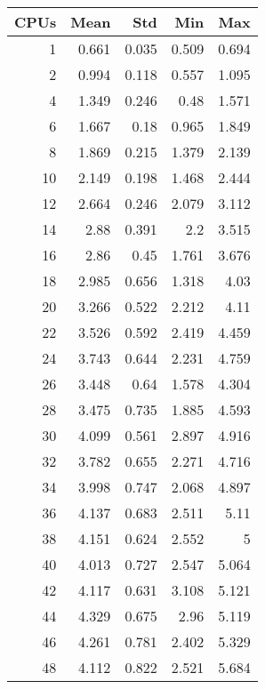 \begin{table}[htbp]
  \centering
  \begin{minipage}{.45\textwidth}
    \centering
    \scriptsize
\begin{tabular}{rrrrr}
\toprule
\textbf{CPUs} & \textbf{Mean} & \textbf{Std} & \textbf{Min} & \textbf{Max} \\
\midrule
1 & 0.661 & 0.035 & 0.509 & 0.694 \\
2 & 0.994 & 0.118 & 0.557 & 1.095 \\
4 & 1.349 & 0.246 & 0.48 & 1.571 \\
6 & 1.667 & 0.18 & 0.965 & 1.849 \\
8 & 1.869 & 0.215 & 1.379 & 2.139 \\
10 & 2.149 & 0.198 & 1.468 & 2.444 \\
12 & 2.664 & 0.246 & 2.079 & 3.112 \\
14 & 2.88 & 0.391 & 2.2 & 3.515 \\
16 & 2.86 & 0.45 & 1.761 & 3.676 \\
18 & 2.985 & 0.656 & 1.318 & 4.03 \\
20 & 3.266 & 0.522 & 2.212 & 4.11 \\
22 & 3.526 & 0.592 & 2.419 & 4.459 \\
24 & 3.743 & 0.644 & 2.231 & 4.759 \\
26 & 3.448 & 0.64 & 1.578 & 4.304 \\
28 & 3.475 & 0.735 & 1.885 & 4.593 \\
30 & 4.099 & 0.561 & 2.897 & 4.916 \\
32 & 3.782 & 0.655 & 2.271 & 4.716 \\
34 & 3.998 & 0.747 & 2.068 & 4.897 \\
36 & 4.137 & 0.683 & 2.511 & 5.11 \\
38 & 4.151 & 0.624 & 2.552 & 5 \\
40 & 4.013 & 0.727 & 2.547 & 5.064 \\
42 & 4.117 & 0.631 & 3.108 & 5.121 \\
44 & 4.329 & 0.675 & 2.96 & 5.119 \\
46 & 4.261 & 0.781 & 2.402 & 5.329 \\
48 & 4.112 & 0.822 & 2.521 & 5.684 \\
\bottomrule
\end{tabular}


\end{minipage}
\end{table}
